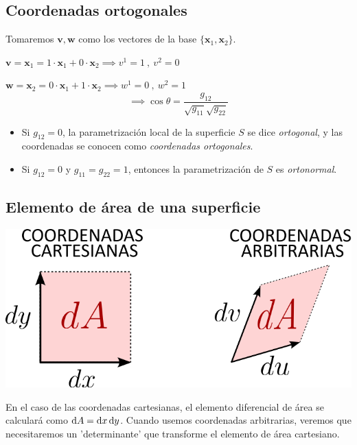 \subsection{Coordenadas ortogonales}
Tomaremos $\mathbf{v,w}$ como los vectores de la base $\{ \mathbf{x}_1,\mathbf{x}_2 \}$.

$
\mathbf{v}=\mathbf{x}_1=1\cdot \mathbf{x}_1+0\cdot \mathbf{x}_2\implies v^1=1 \ , \ v^2=0
$

$
\mathbf{w}=\mathbf{x}_2=0\cdot \mathbf{x}_1+1\cdot \mathbf{x}_2 \implies w^1=0 \ , \ w^2=1
$
$$
\implies \cos \theta =\frac{g_{12}}{\sqrt{g_{11}}\sqrt{g_{22}}}
$$
\begin{itemize}
    \item Si $g_{12}=0$, la parametrización local de la superficie $S$ se dice \emph{ortogonal}, y las coordenadas se conocen como \emph{coordenadas ortogonales}.

    \item Si $g_{12}=0$ y $g_{11}=g_{22}=1$, entonces la parametrización de $S$ es \emph{ortonormal}. 
\end{itemize}

\subsection{Elemento de área de una superficie}
\begin{center}
    \includegraphics[scale=.4]{FOTOS/elem_area.png}
\end{center}
En el caso de las coordenadas cartesianas, el elemento diferencial de área se calculará como $\odif{A}=\odif{x}\odif{y}$. Cuando usemos coordenadas arbitrarias, veremos que necesitaremos un 'determinante' que transforme el elemento de área cartesiano.\\

